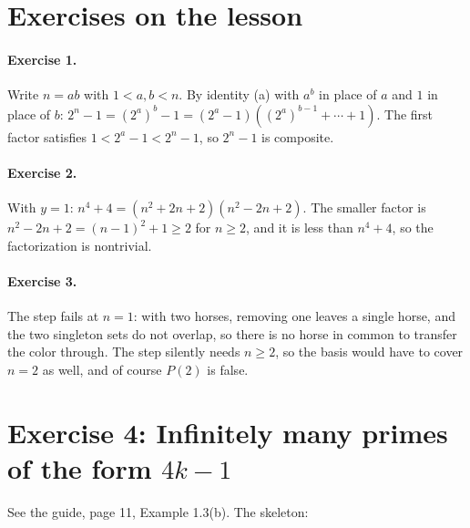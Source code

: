 \documentclass[11pt]{article}
\begin{document}

\section*{Exercises on the lesson}

\paragraph{Exercise 1.} Write $n = ab$ with $1 < a, b < n$. By identity (a) with $a^b$ in place of $a$ and $1$ in place of $b$: $2^n - 1 = (2^a)^b - 1 = (2^a - 1)\left((2^a)^{b-1} + \cdots + 1\right)$. The first factor satisfies $1 < 2^a - 1 < 2^n - 1$, so $2^n - 1$ is composite.

\paragraph{Exercise 2.} With $y = 1$: $n^4 + 4 = (n^2 + 2n + 2)(n^2 - 2n + 2)$. The smaller factor is $n^2 - 2n + 2 = (n-1)^2 + 1 \ge 2$ for $n \ge 2$, and it is less than $n^4 + 4$, so the factorization is nontrivial.

\paragraph{Exercise 3.} The step fails at $n = 1$: with two horses, removing one leaves a single horse, and the two singleton sets do not overlap, so there is no horse in common to transfer the color through. The step silently needs $n \ge 2$, so the basis would have to cover $n = 2$ as well, and of course $P(2)$ is false.

\section*{Exercise 4: Infinitely many primes of the form $4k-1$}

See the guide, page 11, Example 1.3(b). The skeleton:
\end{document}
